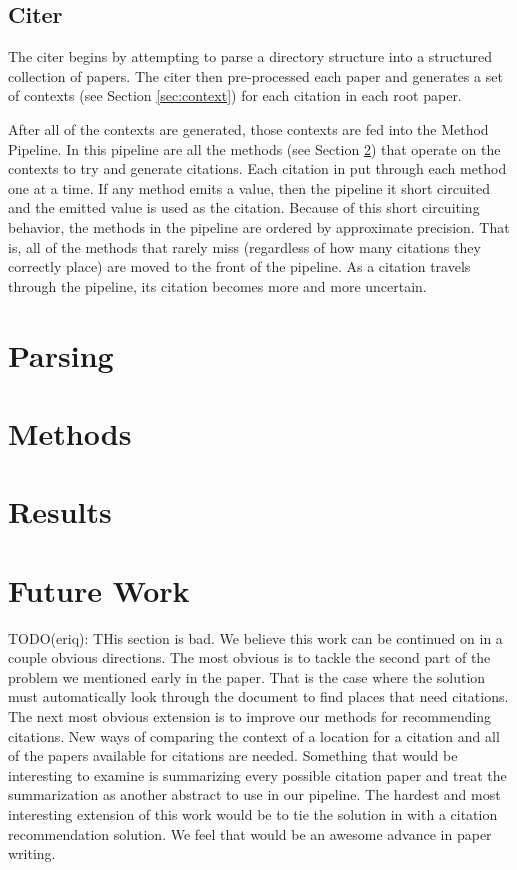 \documentclass[10pt, conference, compsocconf]{IEEEtran}
\begin{document}
\subsection{Citer}\label{sec:archCiter}
The citer begins by attempting to parse a directory structure into a structured collection of papers.
The citer then pre-processed each paper and generates a set of contexts (see Section \ref{sec:context}) for each citation in each
root paper.

After all of the contexts are generated, those contexts are fed into the Method Pipeline. In this pipeline are all the methods (see Section \ref{sec:methods})
that operate on the contexts to try and generate citations. Each citation in put through each method one at a time. If any method emits a value, then the pipeline
it short circuited and the emitted value is used as the citation. Because of this short circuiting behavior, the methods in the pipeline are ordered by approximate
precision. That is, all of the methods that rarely miss (regardless of how many citations they correctly place) are moved to the front of the pipeline.
As a citation travels through the pipeline, its citation becomes more and more uncertain.

\section{Parsing}\label{sec:parsing}
\label{sec:context}

\section{Methods}\label{sec:methods}

\section{Results}\label{sec:results}

\section{Future Work}\label{sec:future}
TODO(eriq): THis section is bad.
We believe this work can be continued on in a couple obvious directions. The most obvious is to tackle the second part of the problem we mentioned early in the paper. That is the case where the solution must automatically look through the document to find places that need citations. The next most obvious extension is to improve our methods for recommending citations. New ways of comparing the context of a location for a citation and all of the papers available for citations are needed. Something that would be interesting to examine is summarizing every possible citation paper and treat the summarization as another abstract to use in our pipeline. The hardest and most interesting extension
of this work would be to tie the solution in with a citation recommendation solution. We feel that would be an awesome advance in paper writing.
\end{document}
